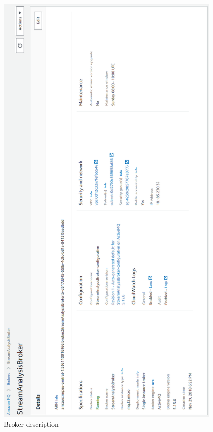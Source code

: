 \begin{figure}[p]
	\centering
	\noindent
	\includegraphics[width=0.5\paperwidth]{./images/aws_resources/AmazonMQ.PNG}
	\caption{Broker description}
	\label{fig:amazonMQ}
\end{figure}



